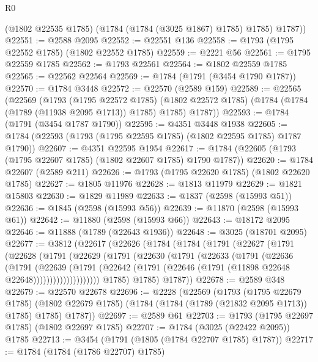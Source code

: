 \begin{lexlean}{R0}
\begin{coremodule}
        (@1802 @22535 @1785)
        (@1784 (@1784 (@3025 @1867) @1785) @1785)
        @1787))
@22551 := @2588 @2095
@22552 := @22551 @136
@22558 := @1793 (@1795 @22552 @1785) (@1802 @22552 @1785)
@22559 := @2221 @56
@22561 := @1795 @22559 @1785
@22562 := @1793 @22561
@22564 := @1802 @22559 @1785
@22565 := @22562 @22564
@22569 := @1784 (@1791 (@3454 @1790 @1787))
@22570 := @1784 @3448
@22572 := @22570 (@2589 @159)
@22589 := @22565
    (@22569
      (@1793
        (@1795 @22572 @1785)
        (@1802 @22572 @1785)
        (@1784 (@1784 (@1789 (@11938 @2095 @1713)) @1785) @1785)
        @1787))
@22593 := @1784 (@1791 (@3454 @1787 @1790))
@22595 := @4351 @3448 @1938
@22605 := @1784 (@22593 (@1793 (@1795 @22595 @1785) (@1802 @22595 @1785) @1787 @1790))
@22607 := @4351 @22595 @1954
@22617 := @1784 (@22605 (@1793 (@1795 @22607 @1785) (@1802 @22607 @1785) @1790 @1787))
@22620 := @1784 @22607 (@2589 @211)
@22626 := @1793 (@1795 @22620 @1785) (@1802 @22620 @1785)
@22627 := @1805 @11976
@22628 := @1813 @11979
@22629 := @1821 @15803
@22630 := @1829 @11989
@22633 := @1837 (@2598 (@15993 @51))
@22636 := @1845 (@2598 (@15993 @56))
@22639 := @11870 (@2598 (@15993 @61))
@22642 := @11880 (@2598 (@15993 @66))
@22643 := @18172 @2095
@22646 := @11888 (@1789 (@22643 @1936))
@22648 := @3025 (@18701 @2095)
@22677 := @3812
    (@22617
      (@22626
        (@1784
          (@1784
            (@1791
              (@22627
                (@1791
                  (@22628
                    (@1791
                      (@22629
                        (@1791
                          (@22630
                            (@1791
                              (@22633
                                (@1791
                                  (@22636
                                    (@1791
                                      (@22639
                                        (@1791
                                          (@22642
                                            (@1791
                                              (@22646
                                                (@1791 (@11898 @22648 @22648))))))))))))))))))))
            @1785)
          @1785)
        @1787))
@22678 := @2589 @348
@22679 := @22570 @22678
@22696 := @2228
    (@22569
      (@1793
        (@1795 @22679 @1785)
        (@1802 @22679 @1785)
        (@1784 (@1784 (@1789 (@21832 @2095 @1713)) @1785) @1785)
        @1787))
@22697 := @2589 @61
@22703 := @1793 (@1795 @22697 @1785) (@1802 @22697 @1785)
@22707 := @1784 (@3025 (@22422 @2095)) @1785
@22713 := @3454 (@1791 (@1805 (@1784 @22707 @1785) @1787))
@22717 := @1784 (@1784 (@1786 @22707) @1785)

\end{coremodule}
\end{lexlean}
